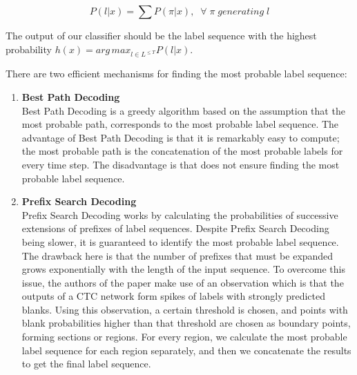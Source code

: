 \begin{equation}
\label{eq:22}
P(l|x) = \sum P(\pi|x), \; \;  \forall \; \pi \; generating \; l
\end{equation}


The output of our classifier should be the label sequence with the highest probability $h(x) = {arg \, max}_{l \in {L^{\leq T}}} P(l|x)$.

There are two efficient mechanisms for finding the most probable label sequence:
\begin{enumerate}
	\item \textbf{Best Path Decoding} \mbox{}\\
	 Best Path Decoding is a greedy algorithm based on the assumption that the most probable path, corresponds to the most probable label sequence. The advantage of Best Path Decoding is that it is remarkably easy to compute; the most probable path is the concatenation of the most probable labels for every time step. The disadvantage is that does not ensure finding the most probable label sequence.
	\item \textbf{Prefix Search Decoding} \mbox{}\\
	Prefix Search Decoding works by calculating the probabilities of successive extensions of prefixes of label sequences. Despite Prefix Search Decoding being slower, it is guaranteed to identify the most probable label sequence. The drawback here is that the number of prefixes that must be expanded grows exponentially with the length of the input sequence. To overcome this issue, the authors of the paper make use of an observation which is that the outputs of a \ac{CTC} network form spikes of labels with strongly predicted blanks. Using this observation, a certain threshold is chosen, and points with blank probabilities higher than that threshold are chosen as boundary points, forming sections or regions. For every region, we calculate the most probable label sequence for each region separately, and then we concatenate the results to get the final label sequence. 
\end{enumerate} 




